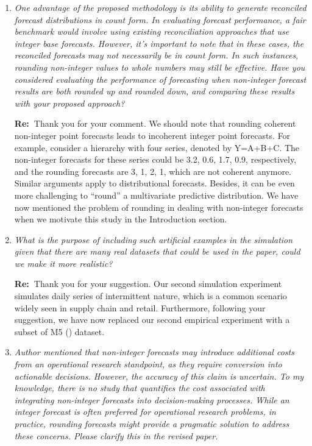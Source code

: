\documentclass[11pt,a4paper]{article}
\newcommand{\RE}[2][Re:~]{{\color{blue}\textbf{#1}#2}}
\begin{document}
\begin{enumerate}
  \item \textit{One advantage of the proposed methodology is its ability to generate reconciled forecast distributions in count form. In evaluating forecast performance, a fair benchmark would involve using existing reconciliation approaches that use integer base forecasts. However, it's important to note that in these cases, the reconciled forecasts may not necessarily be in count form. In such instances, rounding non-integer values to whole numbers may still be effective. Have you considered evaluating the performance of forecasting when non-integer forecast results are both rounded up and rounded down, and comparing these results with your proposed approach?}

  \RE{Thank you for your comment. We should note that rounding coherent non-integer point forecasts leads to incoherent integer point forecasts. For example, consider a hierarchy with four series, denoted by Y=A+B+C. The non-integer forecasts for these series could be 3.2, 0.6, 1.7, 0.9, respectively, and the rounding forecasts are 3, 1, 2, 1, which are not coherent anymore. Similar arguments apply to distributional forecasts. Besides, it can be even more challenging to ``round'' a multivariate predictive distribution. We have now mentioned the problem of rounding in dealing with non-integer forecasts when we motivate this study in the Introduction section.}


  \item \textit{What is the purpose of including such artificial examples in the simulation given that there are many real datasets that could be used in the paper, could we make it more realistic?}

  \RE{Thank you for your suggestion. Our second simulation experiment simulates daily series of intermittent nature, which is a common scenario widely seen in supply chain and retail. Furthermore, following your suggestion, we have now replaced our second empirical experiment with a subset of M5 (\citealp{makridakisM5AccuracyCompetition2022}) dataset.}

  \item \textit{Author mentioned that non-integer forecasts may introduce additional costs from an operational research standpoint, as they require conversion into actionable decisions. However, the accuracy of this claim is uncertain. To my knowledge, there is no study that quantifies the cost associated with integrating non-integer forecasts into decision-making processes. While an integer forecast is often preferred for operational research problems, in practice, rounding forecasts might provide a pragmatic solution to address these concerns. Please clarify this in the revised paper.}
  

\end{enumerate}
\end{document}
